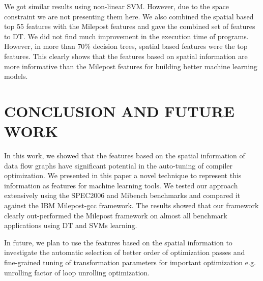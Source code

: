 \documentclass[conference]{IEEEtran}
\begin{document}
We got similar results using non-linear SVM. However, due to the space constraint we are not presenting them here. We also combined the spatial based top 55 features with the Milepost features and gave the combined set of features to DT. We did not find much improvement in the execution
time of programs. However, in more than 70\% decision trees, spatial based features were the top features. This clearly shows that the features based on spatial information are more informative than the Milepost features for building better machine learning models.




\section{CONCLUSION AND FUTURE WORK}


In this work, we showed that the features based on the spatial information of data flow graphs have significant potential in the auto-tuning of compiler optimization. We presented in this paper a novel technique to represent this information as features for machine learning tools. We tested our approach extensively using the SPEC2006 and Mibench benchmarks and compared it against the IBM Milepost-gcc framework. The results showed that our framework clearly out-performed the Milepost framework on almost all benchmark applications using DT and SVMs learning. 

In future, we plan to use the features based on the spatial information to investigate the automatic selection of better order of optimization passes and fine-grained tuning of transformation parameters for important optimization e.g. unrolling factor of loop unrolling optimization.





\end{document}
